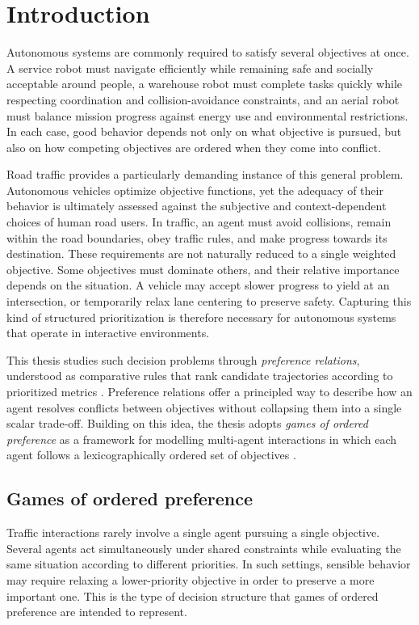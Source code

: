 \chapter{Introduction}
\label{ch:introduction}

Autonomous systems are commonly required to satisfy several objectives at
once. A service robot must navigate efficiently while remaining safe and
socially acceptable around people, a warehouse robot must complete tasks
quickly while respecting coordination and collision-avoidance constraints,
and an aerial robot must balance mission progress against energy use and
environmental restrictions. In each case, good behavior depends not only
on what objective is pursued, but also on how competing objectives are
ordered when they come into conflict.

Road traffic provides a particularly demanding instance of this general
problem. Autonomous vehicles optimize objective functions, yet the
adequacy of their behavior is ultimately assessed against the subjective
and context-dependent choices of human road users. In traffic, an agent
must avoid collisions, remain within the road boundaries, obey traffic
rules, and make progress towards its destination. These requirements are
not naturally reduced to a single weighted objective. Some objectives must
dominate others, and their relative importance depends on the situation. A
vehicle may accept slower progress to yield at an intersection, or
temporarily relax lane centering to preserve safety. Capturing this kind
of structured prioritization is therefore necessary for autonomous systems
that operate in interactive environments.

This thesis studies such decision problems through \emph{preference
relations}, understood as comparative rules that rank candidate
trajectories according to prioritized metrics \cite{hausman:2011}.
Preference relations offer a principled way to describe how an agent
resolves conflicts between objectives without collapsing them into a
single scalar trade-off. Building on this idea, the thesis adopts
\emph{games of ordered preference} as a framework for modelling multi-agent
interactions in which each agent follows a lexicographically ordered set
of objectives \cite{zanardi:2022,lee:2025}.

\section{Games of ordered preference}

Traffic interactions rarely involve a single agent pursuing a single
objective. Several agents act simultaneously under shared constraints
while evaluating the same situation according to different priorities. In
such settings, sensible behavior may require relaxing a lower-priority
objective in order to preserve a more important one. This is the type of
decision structure that games of ordered preference are intended to
represent.


